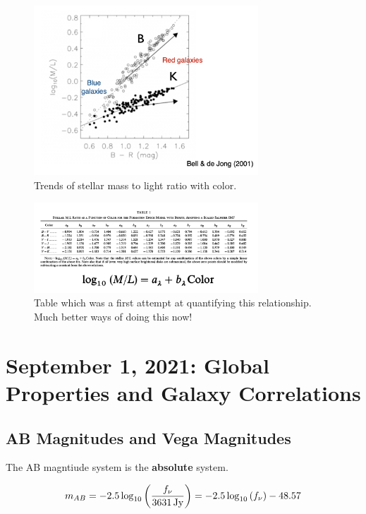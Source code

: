 \documentclass{article}
\newcommand{\unit}[1]{{\,\rm #1}}
\newcommand{\jy}{\unit{Jy}}
\begin{document}
\begin{figure}
    \centering
    \includegraphics[width=0.75\textwidth]{figs/Screen Shot 2021-08-27 at 2.31.11 PM.png}
    \caption{Trends of stellar mass to light ratio with color. }
    \label{fig:color_ml}
\end{figure}

\begin{figure}
    \centering
    \includegraphics[width=0.75\textwidth]{figs/Screen Shot 2021-08-27 at 2.31.21 PM.png}
    \caption{Table which was a first attempt at quantifying this relationship. Much better ways of doing this now!}
    \label{fig:color_ml_2}
\end{figure}

\section{September 1, 2021: Global Properties and Galaxy Correlations}

\subsection{AB Magnitudes and Vega Magnitudes}

The AB magntiude system is the \textbf{absolute} system. 

\begin{equation}
    m_{AB} = -2.5\log_{10}\left(\frac{f_\nu}{3631 \jy }\right) = -2.5\log_{10}\left(f_\nu\right) - 48.57
\end{equation}
\end{document}
